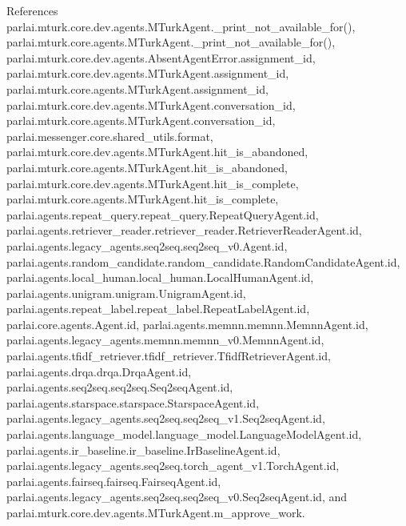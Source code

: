 References parlai.\+mturk.\+core.\+dev.\+agents.\+M\+Turk\+Agent.\+\_\+print\+\_\+not\+\_\+available\+\_\+for(), parlai.\+mturk.\+core.\+agents.\+M\+Turk\+Agent.\+\_\+print\+\_\+not\+\_\+available\+\_\+for(), parlai.\+mturk.\+core.\+dev.\+agents.\+Absent\+Agent\+Error.\+assignment\+\_\+id, parlai.\+mturk.\+core.\+dev.\+agents.\+M\+Turk\+Agent.\+assignment\+\_\+id, parlai.\+mturk.\+core.\+agents.\+M\+Turk\+Agent.\+assignment\+\_\+id, parlai.\+mturk.\+core.\+dev.\+agents.\+M\+Turk\+Agent.\+conversation\+\_\+id, parlai.\+mturk.\+core.\+agents.\+M\+Turk\+Agent.\+conversation\+\_\+id, parlai.\+messenger.\+core.\+shared\+\_\+utils.\+format, parlai.\+mturk.\+core.\+dev.\+agents.\+M\+Turk\+Agent.\+hit\+\_\+is\+\_\+abandoned, parlai.\+mturk.\+core.\+agents.\+M\+Turk\+Agent.\+hit\+\_\+is\+\_\+abandoned, parlai.\+mturk.\+core.\+dev.\+agents.\+M\+Turk\+Agent.\+hit\+\_\+is\+\_\+complete, parlai.\+mturk.\+core.\+agents.\+M\+Turk\+Agent.\+hit\+\_\+is\+\_\+complete, parlai.\+agents.\+repeat\+\_\+query.\+repeat\+\_\+query.\+Repeat\+Query\+Agent.\+id, parlai.\+agents.\+retriever\+\_\+reader.\+retriever\+\_\+reader.\+Retriever\+Reader\+Agent.\+id, parlai.\+agents.\+legacy\+\_\+agents.\+seq2seq.\+seq2seq\+\_\+v0.\+Agent.\+id, parlai.\+agents.\+random\+\_\+candidate.\+random\+\_\+candidate.\+Random\+Candidate\+Agent.\+id, parlai.\+agents.\+local\+\_\+human.\+local\+\_\+human.\+Local\+Human\+Agent.\+id, parlai.\+agents.\+unigram.\+unigram.\+Unigram\+Agent.\+id, parlai.\+agents.\+repeat\+\_\+label.\+repeat\+\_\+label.\+Repeat\+Label\+Agent.\+id, parlai.\+core.\+agents.\+Agent.\+id, parlai.\+agents.\+memnn.\+memnn.\+Memnn\+Agent.\+id, parlai.\+agents.\+legacy\+\_\+agents.\+memnn.\+memnn\+\_\+v0.\+Memnn\+Agent.\+id, parlai.\+agents.\+tfidf\+\_\+retriever.\+tfidf\+\_\+retriever.\+Tfidf\+Retriever\+Agent.\+id, parlai.\+agents.\+drqa.\+drqa.\+Drqa\+Agent.\+id, parlai.\+agents.\+seq2seq.\+seq2seq.\+Seq2seq\+Agent.\+id, parlai.\+agents.\+starspace.\+starspace.\+Starspace\+Agent.\+id, parlai.\+agents.\+legacy\+\_\+agents.\+seq2seq.\+seq2seq\+\_\+v1.\+Seq2seq\+Agent.\+id, parlai.\+agents.\+language\+\_\+model.\+language\+\_\+model.\+Language\+Model\+Agent.\+id, parlai.\+agents.\+ir\+\_\+baseline.\+ir\+\_\+baseline.\+Ir\+Baseline\+Agent.\+id, parlai.\+agents.\+legacy\+\_\+agents.\+seq2seq.\+torch\+\_\+agent\+\_\+v1.\+Torch\+Agent.\+id, parlai.\+agents.\+fairseq.\+fairseq.\+Fairseq\+Agent.\+id, parlai.\+agents.\+legacy\+\_\+agents.\+seq2seq.\+seq2seq\+\_\+v0.\+Seq2seq\+Agent.\+id, and parlai.\+mturk.\+core.\+dev.\+agents.\+M\+Turk\+Agent.\+m\+\_\+approve\+\_\+work.

